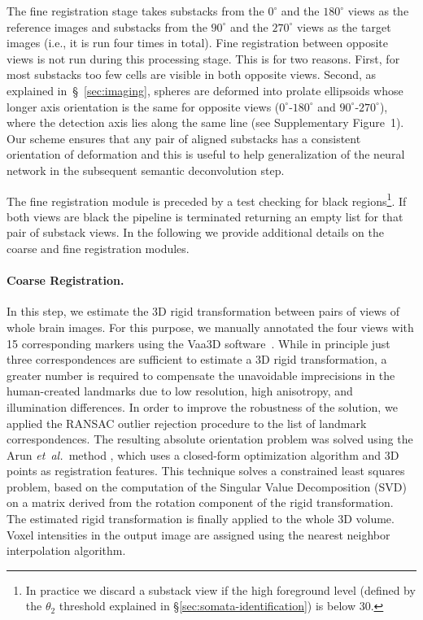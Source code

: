 \documentclass[smallextended]{svjour3}       %
\newcommand{\etal}{\mbox{\emph{et al.\ }}}
\begin{document}
The fine registration stage takes substacks from the $0^\circ$ and the
$180^\circ$ views as the reference images and substacks from the
$90^\circ$ and the $270^\circ$ views as the target images (i.e., it is
run four times in total). Fine registration between opposite views is
not run during this processing stage. This is for two reasons. First,
for most substacks too few cells are visible in both opposite views. Second, as
explained in~\S~\ref{sec:imaging}, spheres are deformed into prolate
ellipsoids whose longer axis orientation is the same for opposite
views ($0^\circ$-$180^\circ$ and $90^\circ$-$270^\circ$), where the
detection axis lies along the same line (see Supplementary Figure~1).
Our scheme ensures that any pair of aligned substacks has a consistent
orientation of deformation and this is useful to help generalization
of the neural network in the subsequent semantic deconvolution step.

The fine registration module is preceded by a test checking for black
regions\footnote{In practice we discard a substack view if the
  high foreground level (defined by the $\theta_2$ threshold explained in
  \S\ref{sec:somata-identification}) is below 30.}. If both views are
black the pipeline is terminated returning an empty list for that pair
of substack views.
In the following we provide additional details on the coarse and fine registration modules.



\paragraph{Coarse Registration.}
In this step, we estimate the 3D rigid transformation between pairs of
views of whole brain images. For this purpose, we manually annotated
the four views with 15 corresponding markers using the Vaa3D
software~\cite{peng_v3d_2010}. While in principle just three
correspondences are sufficient to estimate a 3D rigid transformation,
a greater number is required to compensate the unavoidable
imprecisions in the human-created landmarks due to low resolution, high
anisotropy, and illumination differences.
In order to improve the robustness of the solution, we applied the
RANSAC outlier rejection procedure
\cite{fischler_random_1981} to the list of landmark
correspondences. %
The resulting absolute orientation problem was solved using the
Arun \etal method \cite{arun_least-squares_1987}, which uses a closed-form
optimization algorithm and 3D points as registration features. This
technique solves a constrained least squares problem, based on the
computation of the Singular Value Decomposition (SVD) on a matrix
derived from the rotation component of the rigid transformation.
The estimated rigid transformation is finally applied to the whole 3D
volume.  Voxel intensities in the output image are assigned using the
nearest neighbor interpolation algorithm.
\end{document}

